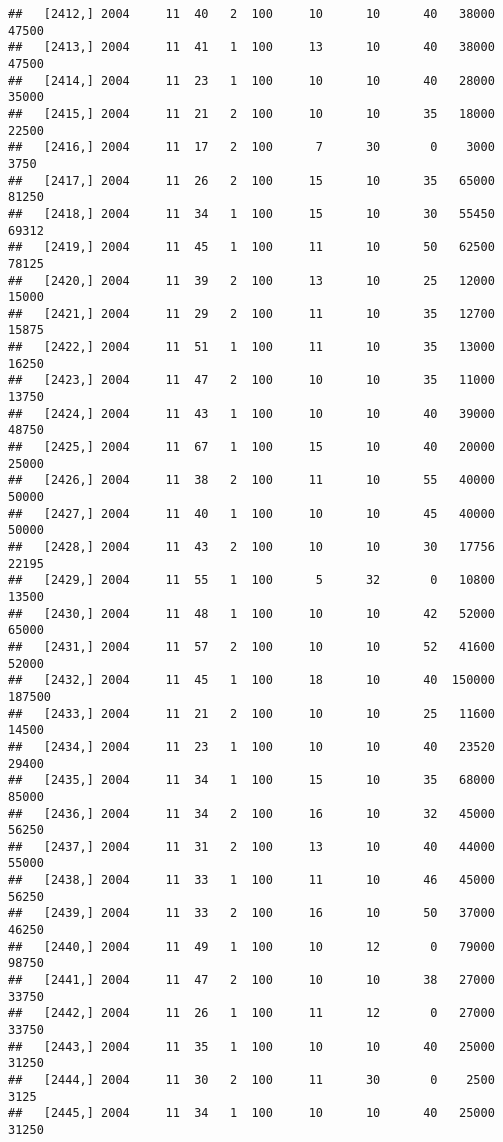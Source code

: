 \documentclass{article}\usepackage[]{graphicx}\usepackage[]{color}
\makeatletter
\newenvironment{kframe}{%
 \def\at@end@of@kframe{}%
 \ifinner\ifhmode%
  \def\at@end@of@kframe{\end{minipage}}%
  \begin{minipage}{\columnwidth}%
 \fi\fi%
 \def\FrameCommand##1{\hskip\@totalleftmargin \hskip-\fboxsep
 \colorbox{shadecolor}{##1}\hskip-\fboxsep
     \hskip-\linewidth \hskip-\@totalleftmargin \hskip\columnwidth}%
 \MakeFramed {\advance\hsize-\width
   \@totalleftmargin\z@ \linewidth\hsize
   \@setminipage}}%
 {\par\unskip\endMakeFramed%
 \at@end@of@kframe}
\newenvironment{knitrout}{}{} %
\makeatother
\begin{document}
\begin{knitrout}
\begin{kframe}
\begin{verbatim}
##   [2412,] 2004     11  40   2  100     10      10      40   38000   47500
##   [2413,] 2004     11  41   1  100     13      10      40   38000   47500
##   [2414,] 2004     11  23   1  100     10      10      40   28000   35000
##   [2415,] 2004     11  21   2  100     10      10      35   18000   22500
##   [2416,] 2004     11  17   2  100      7      30       0    3000    3750
##   [2417,] 2004     11  26   2  100     15      10      35   65000   81250
##   [2418,] 2004     11  34   1  100     15      10      30   55450   69312
##   [2419,] 2004     11  45   1  100     11      10      50   62500   78125
##   [2420,] 2004     11  39   2  100     13      10      25   12000   15000
##   [2421,] 2004     11  29   2  100     11      10      35   12700   15875
##   [2422,] 2004     11  51   1  100     11      10      35   13000   16250
##   [2423,] 2004     11  47   2  100     10      10      35   11000   13750
##   [2424,] 2004     11  43   1  100     10      10      40   39000   48750
##   [2425,] 2004     11  67   1  100     15      10      40   20000   25000
##   [2426,] 2004     11  38   2  100     11      10      55   40000   50000
##   [2427,] 2004     11  40   1  100     10      10      45   40000   50000
##   [2428,] 2004     11  43   2  100     10      10      30   17756   22195
##   [2429,] 2004     11  55   1  100      5      32       0   10800   13500
##   [2430,] 2004     11  48   1  100     10      10      42   52000   65000
##   [2431,] 2004     11  57   2  100     10      10      52   41600   52000
##   [2432,] 2004     11  45   1  100     18      10      40  150000  187500
##   [2433,] 2004     11  21   2  100     10      10      25   11600   14500
##   [2434,] 2004     11  23   1  100     10      10      40   23520   29400
##   [2435,] 2004     11  34   1  100     15      10      35   68000   85000
##   [2436,] 2004     11  34   2  100     16      10      32   45000   56250
##   [2437,] 2004     11  31   2  100     13      10      40   44000   55000
##   [2438,] 2004     11  33   1  100     11      10      46   45000   56250
##   [2439,] 2004     11  33   2  100     16      10      50   37000   46250
##   [2440,] 2004     11  49   1  100     10      12       0   79000   98750
##   [2441,] 2004     11  47   2  100     10      10      38   27000   33750
##   [2442,] 2004     11  26   1  100     11      12       0   27000   33750
##   [2443,] 2004     11  35   1  100     10      10      40   25000   31250
##   [2444,] 2004     11  30   2  100     11      30       0    2500    3125
##   [2445,] 2004     11  34   1  100     10      10      40   25000   31250

\end{verbatim}
\end{kframe}
\end{knitrout}
\end{document}
